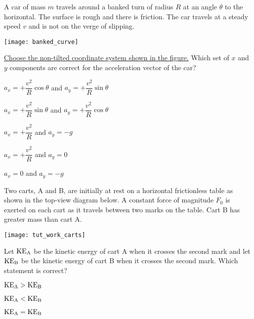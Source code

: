\documentclass[11pt]{article}
\begin{document}
\begin{enumerate}
\begin{minipage}[t]{\lw}
\item A car of mass $m$ travels around a banked turn of radius $R$ at an angle $\theta$ to the horizontal. The surface is rough and there is friction. The car travels at a steady speed $v$ and is not on the verge of slipping.
\begin{center}
\texttt{[image: banked\_curve]}
\end{center}
\uline{Choose the non-tilted coordinate system shown in the figure.} Which set of $x$ and $y$ components are correct for the acceleration vector of the car?
\begin{choices}
\item $a_x=+\dfrac{v^2}{R}\cos\theta$ and $a_y=+\dfrac{v^2}{R}\sin\theta$\\[.1in]
\item $a_x=+\dfrac{v^2}{R}\sin\theta$ and $a_y=+\dfrac{v^2}{R}\cos\theta$\\[.1in]
\item $a_x=+\dfrac{v^2}{R}$ and $a_y=-g$\\[.1in]
\item $a_x=+\dfrac{v^2}{R}$ and $a_y=0$\\[.1in]
\item $a_x=0$ and $a_y=-g$
\end{choices}
\end{minipage}

\begin{minipage}[t]{\lw}
\item Two carts, A and B, are initially at rest on a horizontal frictionless table as shown in the top-view diagram below. A constant force of magnitude $F_0$ is exerted on each cart as it travels between two marks on the table. Cart B has greater mass than cart A.
\begin{center}
\texttt{[image: tut\_work\_carts]}
\end{center}
Let ${\rm KE}_{\rm A}$ be the kinetic energy of cart A when it crosses the second mark and let ${\rm KE}_{\rm B}$ be the kinetic energy of cart B when it crosses the second mark. Which statement is correct?
\begin{choices}
\item ${\rm KE}_{\rm A}>{\rm KE}_{\rm B}$
\item ${\rm KE}_{\rm A}<{\rm KE}_{\rm B}$
\item ${\rm KE}_{\rm A}={\rm KE}_{\rm B}$
\end{choices}
\end{minipage}


\end{enumerate}
\end{document}
